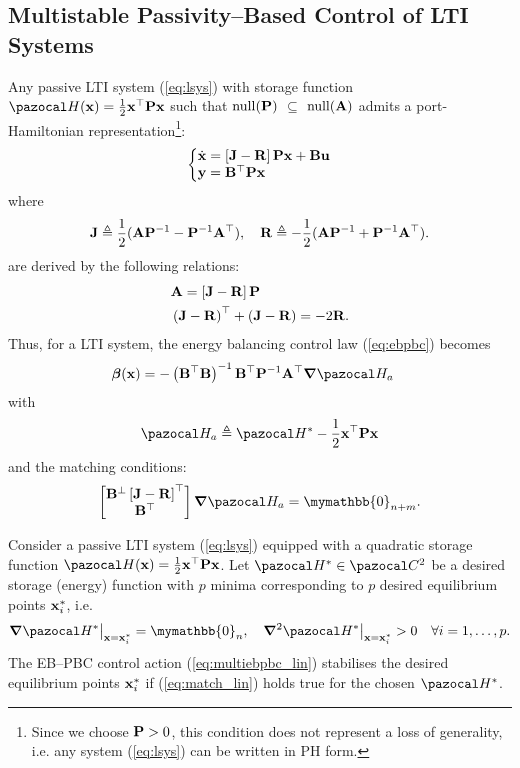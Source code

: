 \subsection{Multistable Passivity--Based Control of LTI Systems}
%
Any passive LTI system (\ref{eq:lsys}) with storage function $\Ha(\xb) = \frac{1}{2}\xb^\top \Pb\xb$ such that $\operatorname{null}(\mathbf{P})$ $\subseteq$ $\operatorname{null}(\mathbf{A})$ admits a port-Hamiltonian representation\footnote{Since we choose $\mathbf{P}>0$, this condition does not represent a loss of generality, i.e. any system (\ref{eq:lsys}) can be written in PH form.}:
%
\begin{equation}
    \left\{
    \begin{matrix*}[l]
    \dot{\xb} = \left[\Jb-\Rb\right]\Pb\xb + \Bb\ub\\
    \yb = \Bb^\top \Pb\xb
    \end{matrix*}
    \right.
\end{equation}
%
where 
%
\begin{equation}
    \mathbf{J} \triangleq \frac{1}{2}(\mathbf{A}\mathbf{P}^{-1}-\mathbf{P}^{-1}\mathbf{A}^\top),\quad\mathbf{R} \triangleq- \frac{1}{2}(\mathbf{A}\mathbf{P}^{-1}+\mathbf{P}^{-1}\mathbf{A}^\top).
\end{equation}
% 
are derived by the following relations:
%
\begin{align}
    & \mathbf{A} = \left[\mathbf{J}-\mathbf{R}\right]\mathbf{P}\\
    & \left(\mathbf{J}-\mathbf{R}\right)^\top + \left(\mathbf{J}-\mathbf{R}\right) = -2\mathbf{R}.
\end{align}
%
Thus, for a LTI system, the energy balancing control law (\ref{eq:ebpbc}) becomes 
%
\begin{align}\label{eq:multiebpbc_lin}
    \bm\beta(\xb) &= -\left(\Bb^\top\Bb\right)^{-1}\Bb^\top\Pb^{-1}\Ab^\top\bm\nabla\Ha_a
\end{align}
%
with
%
\begin{equation}
    \Ha_a\triangleq\Ha^*-\frac{1}{2}\xb^\top \Pb\xb
\end{equation}
%
and the matching conditions:
%
\begin{equation}\label{eq:match_lin}
    \begin{bmatrix}
        {\Bb}^{\perp}\left[\Jb-\Rb\right]^\top\\
        {\Bb}^\top
    \end{bmatrix}
    \bm\nabla\Ha_a =\mymathbb{0}_{n+m}.
\end{equation}
%
\begin{prop}
	Consider a passive LTI system (\ref{eq:lsys}) equipped with a quadratic storage function $\Ha(\xb) = \frac{1}{2}\xb^\top \Pb\xb$. Let $\Ha^*\in\C^2$ be a desired storage (energy) function with $p$ minima corresponding to $p$ desired equilibrium points $\mathbf{x}^*_i$, i.e.
	\begin{equation}
	\bm\nabla\Ha^*\big|_{\xb = \xb^*_i} = \mymathbb{0}_n,~~~ \bm\nabla^2 \Ha^*\big|_{\xb = \xb^*_i}>0\quad\forall i = 1,\dots,p.
	\end{equation}
	The EB--PBC control action (\ref{eq:multiebpbc_lin})
	stabilises the desired equilibrium points $\mathbf{x}^*_i$ if (\ref{eq:match_lin}) holds true for the chosen $\Ha^*$.
\end{prop}
